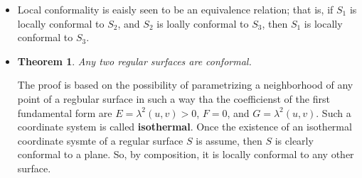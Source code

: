 \documentclass[10pt]{article}
\newtheorem{theorem}[lemma]{Theorem}
\begin{document}
\begin{itemize}
    \item Local conformality is eaisly seen to be an equivalence relation; that is, if $S_1$ is locally conformal to $S_2$, and $S_2$ is loally conformal to $S_3$, then $S_1$ is locally conformal to $S_3$.

    \item \begin{theorem}
      Any two regular surfaces are conformal.
    \end{theorem}

    The proof is based on the possibility of parametrizing a neighborhood of any point of a regbular surface in such a way tha the coefficienst of the first fundamental form are $E = \lambda^2(u,v) > 0$, $F = 0$, and $G = \lambda^2(u,v).$ Such a coordinate system is called {\bf isothermal}. Once the existence of an isothermal coordinate sysmte of a regular surface $S$ is assume, then $S$ is clearly conformal to a plane. So, by composition, it is locally conformal to any other surface.
  \end{itemize}  
 
\end{document}
